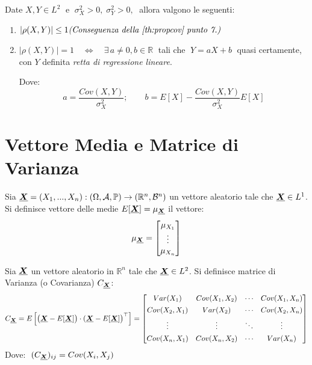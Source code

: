 \begin{proposizione}
    Date $X, Y\in L^2\;$ e $\;\sigma_X^2>0, \;\sigma_Y^2>0,\;$ allora valgono le seguenti:
    \begin{enumerate}
        \item $\left|\rho(X, Y)\right|\leq 1\hfill \textit{(Conseguenza della \ref{th:propcov} punto 7.)}$
        \item $\left|\rho(X, Y)\right| = 1 \quad \iff\quad \exists \,a\neq0, b\in\mathbb{R}\;$ tali che $\;Y = aX+b\;$ quasi certamente, con $Y$ definita \textit{retta di regressione lineare}.

        \medskip
        \noindent Dove:
        \[a = \frac{Cov(X, Y)}{\sigma_X^2};\qquad b = E[X] -\frac{Cov(X, Y)}{\sigma_X^2} E[X]\]
    \end{enumerate}
\end{proposizione}

\section{Vettore Media e Matrice di Varianza}
\begin{definizione}
    Sia $\underline{{\boldsymbol{X}}} = (X_1, ..., X_n):(\Omega, \mathcal{A}, \mathbb{P})\to (\mathbb{R}^n, \mathcal{B}^n)$ un vettore aleatorio tale che $\underline{{\boldsymbol{X}}}\in L^1$. Si definisce vettore delle medie $E[\underline{{\boldsymbol{X}}}]=\mu_{\underline{{\boldsymbol{X}}}}$ il vettore:
\[\mu_{\underline{{\boldsymbol{X}}}} = \begin{bmatrix} \mu_{X_1} \\ \vdots\\\mu_{X_n}\end{bmatrix}\]
\end{definizione}

\begin{definizione}
    Sia $\underline{{\boldsymbol{X}}}$ un vettore aleatorio in $\mathbb{R}^n$ tale che $\underline{{\boldsymbol{X}}}\in L^2$. Si definisce matrice di Varianza (o Covarianza) $C_{\underline{{\boldsymbol{X}}}}$:
    \[C_{\underline{{\boldsymbol{X}}}} = E\left[\bigl(\underline{{\boldsymbol{X}}}-E[\underline{{\boldsymbol{X}}}]\bigr)\cdot (\underline{{\boldsymbol{X}}}-E[\underline{{\boldsymbol{X}}}]\bigr)^\top\right] = \begin{bmatrix}
Var(X_1) & Cov(X_1, X_2) & \cdots & Cov(X_1, X_n)\\[4pt]
Cov(X_2, X_1) & Var(X_2) & \cdots & Cov(X_2, X_n)\\[4pt]
\vdots & \vdots & \ddots & \vdots\\[4pt]
Cov(X_n, X_1) & Cov(X_n, X_2) & \cdots & Var(X_n)
\end{bmatrix}\]
 Dove: $\;(C_{\underline{{\boldsymbol{X}}}})_{ij} = Cov(X_i, X_j)$
\end{definizione}

